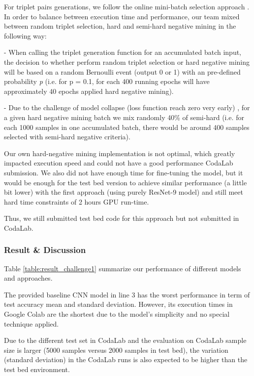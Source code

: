 \documentclass[10pt,twocolumn,letterpaper]{article}
\begin{document}
For triplet pairs generations, we follow the online mini-batch selection approach \cite{SchroffKP15_facenet}. In order to balance between execution time and performance, our team mixed between random triplet selection, hard and semi-hard negative mining in the following way:

\hspace{0.2cm}- When calling the triplet generation function for an accumulated batch input, the decision to whether perform random triplet selection or hard negative mining will be based on a random Bernoulli event (output 0 or 1) with an pre-defined probability \textit{p} (i.e. for p = 0.1, for each 400 running epochs will have approximately 40 epochs applied hard negative mining).

\hspace{0.2cm}- Due to the challenge of model collapse (loss function reach zero very early) \cite{kertesz20_metric_embedding}, for a given hard negative mining batch we mix randomly 40\% of semi-hard (i.e. for each 1000 samples in one accumulated batch, there would be around 400 samples selected with semi-hard negative criteria).

Our own hard-negative mining implementation is not optimal, which greatly impacted execution speed and could not have a good performance CodaLab submission. We also did not have enough time for fine-tuning the model, but it would be enough for the test bed version to achieve similar performance (a little bit lower) with the first approach (using purely ResNet-9 model) and still meet hard time constraints of 2 hours GPU run-time. 

Thus, we still submitted test bed code for this approach but not submitted in CodaLab.


\subsubsection{Result \& Discussion}
\label{subsubsection:challenge1_result}

Table \ref{table:result_challenge1} summarize our performance of different models and approaches.

The provided baseline CNN model in line 3 has the worst performance in term of test accuracy  mean and standard deviation. However, its execution times in Google Colab are the shortest due to the model's simplicity and no special technique applied. 

Due to the different test set in CodaLab and the evaluation on CodaLab sample size is larger (5000 samples versus 2000 samples in test bed), the variation (standard deviation) in the CodaLab runs is also expected to be higher than the test bed environment.
\end{document}
